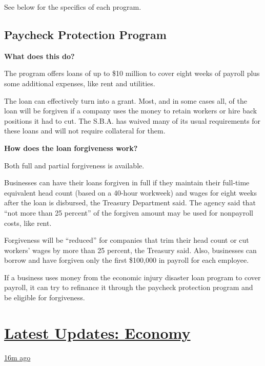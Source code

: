 See below for the specifics of each program.

\hypertarget{paycheck-protection-program}{%
\subsection{Paycheck Protection
Program}\label{paycheck-protection-program}}

\textbf{What does this do?}

The program offers loans of up to \$10 million to cover eight weeks of
payroll plus some additional expenses, like rent and utilities.

The loan can effectively turn into a grant. Most, and in some cases all,
of the loan will be forgiven if a company uses the money to retain
workers or hire back positions it had to cut. The S.B.A. has waived many
of its usual requirements for these loans and will not require
collateral for them.

\textbf{How does the loan forgiveness work?}

Both full and partial forgiveness is available.

Businesses can have their loans forgiven in full if they maintain their
full-time equivalent head count (based on a 40-hour workweek) and wages
for eight weeks after the loan is disbursed, the Treasury Department
said. The agency said that ``not more than 25 percent'' of the forgiven
amount may be used for nonpayroll costs, like rent.

Forgiveness will be ``reduced'' for companies that trim their head count
or cut workers' wages by more than 25 percent, the Treasury said. Also,
businesses can borrow and have forgiven only the first \$100,000 in
payroll for each employee.

If a business uses money from the economic injury disaster loan program
to cover payroll, it can try to refinance it through the paycheck
protection program and be eligible for forgiveness.

\hypertarget{latest-updates-economy}{%
\section{\texorpdfstring{\href{https://www.nytimes.com/live/2020/08/04/business/stock-market-today-coronavirus?action=click\&pgtype=Article\&state=default\&region=MAIN_CONTENT_1\&context=storylines_live_updates}{Latest
Updates:
Economy}}{Latest Updates: Economy}}\label{latest-updates-economy}}

\href{https://www.nytimes.com/live/2020/08/04/business/stock-market-today-coronavirus?action=click\&pgtype=Article\&state=default\&region=MAIN_CONTENT_1\&context=storylines_live_updates\#disney-lost-4-7-billion-last-quarter-but-its-newest-business-was-a-big-hit}{16m
ago}

